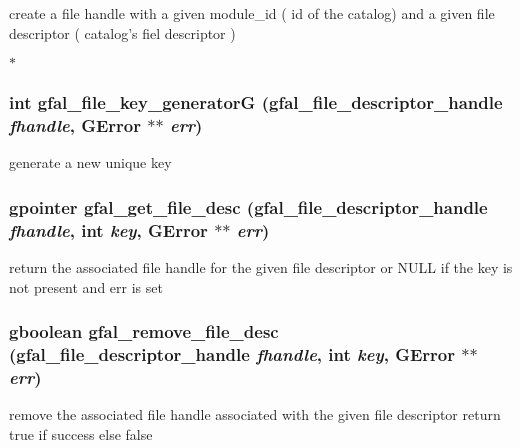 create a file handle with a given module\_\-id ( id of the catalog) and a given file descriptor ( catalog's fiel descriptor )

$\ast$ 
\subsubsection{\setlength{\rightskip}{0pt plus 5cm}int gfal\_\-file\_\-key\_\-generator\-G (gfal\_\-file\_\-descriptor\_\-handle {\em fhandle}, GError $\ast$$\ast$ {\em err})}\label{gfal__common__filedescriptor_8h_15fd77eba0faf86bb3c0ff3939ee2b80}


generate a new unique key 
\subsubsection{\setlength{\rightskip}{0pt plus 5cm}gpointer gfal\_\-get\_\-file\_\-desc (gfal\_\-file\_\-descriptor\_\-handle {\em fhandle}, int {\em key}, GError $\ast$$\ast$ {\em err})}\label{gfal__common__filedescriptor_8h_b1812a17fc7c430f91d738fa51a7f48d}


return the associated file handle for the given file descriptor or NULL if the key is not present and err is set 
\subsubsection{\setlength{\rightskip}{0pt plus 5cm}gboolean gfal\_\-remove\_\-file\_\-desc (gfal\_\-file\_\-descriptor\_\-handle {\em fhandle}, int {\em key}, GError $\ast$$\ast$ {\em err})}\label{gfal__common__filedescriptor_8h_943c20a3d9a14dd8f86ba1abe7bee316}


remove the associated file handle associated with the given file descriptor return true if success else false 